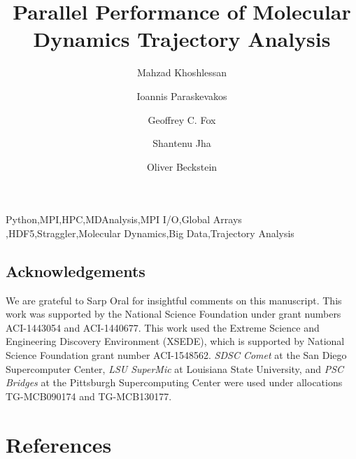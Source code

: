 \documentclass[review,sort&compress,times]{elsarticle}
\begin{document}
\begin{frontmatter}    

\title{Parallel Performance of Molecular Dynamics Trajectory Analysis}

\author[ASUphysics]{Mahzad Khoshlessan}

\author[Rutgers]{Ioannis Paraskevakos}

\author[IndianaDSC]{Geoffrey C. Fox}

\author[Rutgers]{Shantenu Jha}

\author[ASUphysics,ASUCBP]{Oliver Beckstein}

\address[ASUphysics]{Department of Physics, Arizona State University,
  Tempe, AZ 85281, USA}
\address[Rutgers]{Department of Electrical \& Computer Engineering,
  Rutgers University, Piscataway, NJ 08854, USA}
\address[IndianaDSC]{Digital Science Center, Indiana University,
  Bloomington, IN 47405}
\address[ASUCBP]{Center for Biological Physics, Arizona State University,
  Tempe, AZ 85281, USA}

    


\begin{keyword}
Python\sep MPI\sep HPC\sep MDAnalysis\sep MPI I/O\sep Global Arrays \sep HDF5\sep Straggler\sep Molecular Dynamics\sep Big Data\sep Trajectory Analysis
\end{keyword}

\end{frontmatter}












\subsection*{Acknowledgements}
\label{acknowledgements}


We are grateful to Sarp Oral for insightful comments on this manuscript.
This work was supported by the National Science Foundation under grant numbers ACI-1443054 and ACI-1440677.
This work used the Extreme Science and Engineering Discovery Environment (XSEDE), which is supported by National Science Foundation grant number ACI-1548562.
\emph{SDSC Comet} at the San Diego Supercomputer Center, \emph{LSU SuperMic} at Louisiana State University, and \emph{PSC Bridges} at the Pittsburgh Supercomputing Center were used under allocations TG-MCB090174 and TG-MCB130177.

\section*{References}



\clearpage

\appendix



\end{document}
